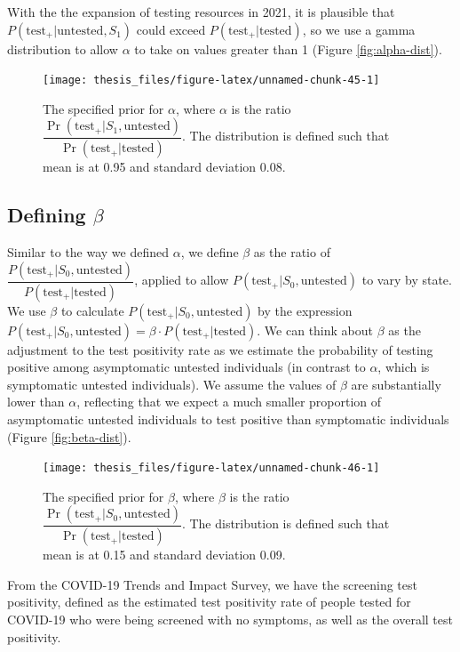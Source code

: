 \documentclass[12pt,twoside]{smiththesis}
\begin{document}
With the the expansion of testing resources in 2021, it is plausible that \(P(\text{test}_+|\text{untested},S_1)\) could exceed \(P(\text{test}_+|\text{tested})\), so we use a gamma distribution to allow \(\alpha\) to take on values greater than 1 (Figure \ref{fig:alpha-dist}).
\begin{figure}

{\centering \texttt{[image: thesis\_files/figure-latex/unnamed-chunk-45-1]} 

}

\caption{\label{fig:alpha-dist}The specified prior for $\alpha$, where $\alpha$ is the ratio $\dfrac{\Pr(\text{test}_+|S_1, \text{untested})}{\Pr(\text{test}_+|\text{tested})}$. The distribution is defined such that mean is at 0.95 and standard deviation 0.08.}\label{fig:unnamed-chunk-45}
\end{figure}
\hypertarget{defining-beta}{%
\subsection{\texorpdfstring{Defining \(\beta\)}{Defining \textbackslash beta}}\label{defining-beta}}

Similar to the way we defined \(\alpha\), we define \(\beta\) as the ratio of \(\dfrac{P(\text{test}_+ |S_0, \text{untested})}{P(\text{test}_+|\text{tested})}\), applied to allow \(P(\text{test}_+ |S_0, \text{untested})\) to vary by state. We use \(\beta\) to calculate \(P(\text{test}_+|S_0, \text{untested})\) by the expression \(P(\text{test}_+|S_0, \text{untested}) =\beta \cdot P(\text{test}_+|\text{tested})\). We can think about \(\beta\) as the adjustment to the test positivity rate as we estimate the probability of testing positive among asymptomatic untested individuals (in contrast to \(\alpha\), which is symptomatic untested individuals). We assume the values of \(\beta\) are substantially lower than \(\alpha\), reflecting that we expect a much smaller proportion of asymptomatic untested individuals to test positive than symptomatic individuals (Figure \ref{fig:beta-dist}).
\begin{figure}

{\centering \texttt{[image: thesis\_files/figure-latex/unnamed-chunk-46-1]} 

}

\caption{\label{fig:beta-dist}The specified prior for $\beta$, where $\beta$ is the ratio $\dfrac{\Pr(\text{test}_+|S_0, \text{untested})}{\Pr(\text{test}_+|\text{tested})}$. The distribution is defined such that mean is at 0.15 and standard deviation 0.09.}\label{fig:unnamed-chunk-46}
\end{figure}
From the COVID-19 Trends and Impact Survey, we have the screening test positivity, defined as the estimated test positivity rate of people tested for COVID-19 who were being screened with no symptoms, as well as the overall test positivity.
\end{document}
